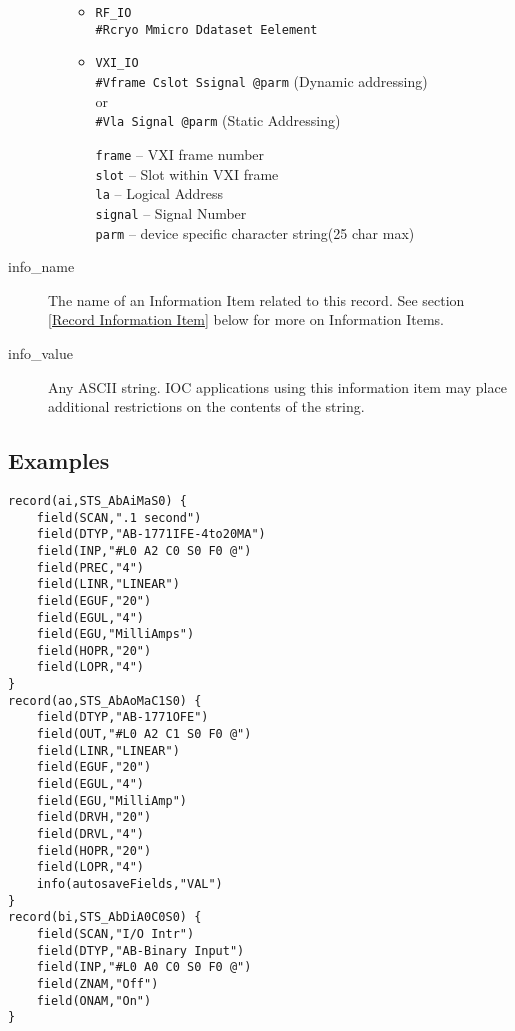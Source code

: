 \begin{description}
\begin{itemize}
\begin{itemize}
\item \verb|RF_IO| \\
\verb|#Rcryo Mmicro Ddataset Eelement|

\item \verb|VXI_IO| \\
\verb|#Vframe Cslot Ssignal @parm| (Dynamic addressing) \\
     or \\
\verb|#Vla Signal @parm|  (Static Addressing)

\verb|frame| -- VXI frame number \\
\verb|slot| -- Slot within VXI frame \\
\verb|la| -- Logical Address \\
\verb|signal| -- Signal Number \\
\verb|parm| -- device specific character string(25 char max)
\end{itemize}
\end{itemize}

\item [info\_name] The name of an Information Item related to this record.
See section \ref{Record Information Item} below for more on Information Items.

\item [info\_value] Any ASCII string.
IOC applications using this information item may place additional restrictions on the contents of the string.

\end{description}

\subsection{Examples}

\begin{verbatim}
record(ai,STS_AbAiMaS0) {
    field(SCAN,".1 second")
    field(DTYP,"AB-1771IFE-4to20MA")
    field(INP,"#L0 A2 C0 S0 F0 @")
    field(PREC,"4")
    field(LINR,"LINEAR")
    field(EGUF,"20")
    field(EGUL,"4")
    field(EGU,"MilliAmps")
    field(HOPR,"20")
    field(LOPR,"4")
}
record(ao,STS_AbAoMaC1S0) {
    field(DTYP,"AB-1771OFE")
    field(OUT,"#L0 A2 C1 S0 F0 @")
    field(LINR,"LINEAR")
    field(EGUF,"20")
    field(EGUL,"4")
    field(EGU,"MilliAmp")
    field(DRVH,"20")
    field(DRVL,"4")
    field(HOPR,"20")
    field(LOPR,"4")
    info(autosaveFields,"VAL")
}
record(bi,STS_AbDiA0C0S0) {
    field(SCAN,"I/O Intr")
    field(DTYP,"AB-Binary Input")
    field(INP,"#L0 A0 C0 S0 F0 @")
    field(ZNAM,"Off")
    field(ONAM,"On")
}
\end{verbatim}

